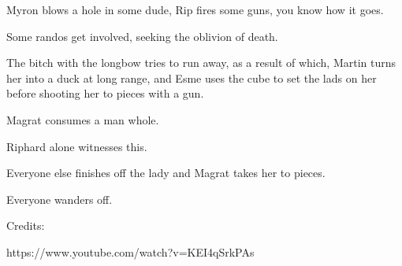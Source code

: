 Myron blows a hole in some dude, Rip fires some guns, you know how it goes.\medskip

Some randos get involved, seeking the oblivion of death.\medskip

The bitch with the longbow tries to run away, as a result of which, Martin turns her into a duck at long range, and Esme uses the cube to set the lads on her before shooting her to pieces with a gun.\medskip

Magrat consumes a man whole.\medskip

Riphard alone witnesses this.\medskip

Everyone else finishes off the lady and Magrat takes her to pieces.\medskip

Everyone wanders off.\medskip

Credits:\medskip

https://www.youtube.com/watch?v=KEI4qSrkPAs\medskip

\vspace*{5mm}
